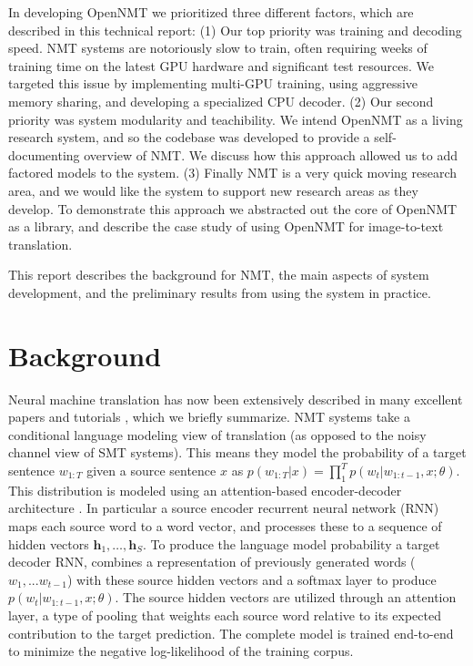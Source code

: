 \documentclass[11pt]{article}
\begin{document}
In developing OpenNMT we prioritized three different factors, which
are described in this technical report: (1) Our top priority was
training and decoding speed. NMT systems are notoriously slow to
train, often requiring weeks of training time on the latest GPU
hardware and significant test resources. We targeted this issue by
implementing multi-GPU training, using aggressive memory sharing, and
developing a specialized CPU decoder. (2) Our second priority was system
modularity and teachibility. We intend OpenNMT as a living research
system, and so the codebase was developed to provide a
self-documenting overview of NMT. We discuss how this approach allowed
us to add factored models \cite{} to the system. (3) Finally NMT is a very 
quick moving research area, and we would like the system to support 
new research areas as they develop. To demonstrate this approach we 
abstracted out the core of OpenNMT as a library, and describe the case 
study of using OpenNMT for image-to-text translation. 

This report describes the background for NMT, the main aspects of system development, and the preliminary results from using the system in practice.  


\section{Background}

Neural machine translation has now been extensively described in many
excellent papers and tutorials \cite{}, which we briefly summarize.
NMT systems take a conditional language modeling view of translation
(as opposed to the noisy channel view of SMT systems). This means they
model the probability of a target sentence $w_{1:T}$ given a source
sentence $x$ as
$p(w_{1:T}| x) = \prod_{1}^T p(w_t| w_{1:t-1}, x; \theta)$. This
distribution is modeled using an attention-based encoder-decoder
architecture \cite{}. In particular a source encoder recurrent neural network
(RNN) maps each source word to a word vector, and processes these to a
sequence of hidden vectors $\mathbf{h}_1, \ldots, \mathbf{h}_S$. To produce the language model probability a target decoder RNN, combines a representation of previously generated words ($w_1, ... w_{t-1}$) with these source hidden vectors and a softmax layer to produce $ p(w_t| w_{1:t-1}, x; \theta)$. The source hidden vectors are utilized through an attention layer, a type of pooling that weights each source word relative to its expected contribution to the target prediction.
The complete model is trained end-to-end to minimize the negative log-likelihood of the training corpus. 
\end{document}
